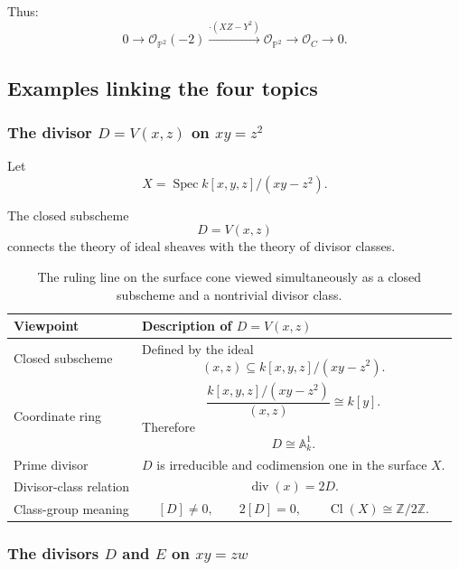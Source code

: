 \documentclass[12pt,a4paper]{article}
\DeclareMathOperator{\Spec}{Spec}
\newcommand{\OO}{\mathcal{O}}
\newcommand{\divisor}{\operatorname{div}}
\newcommand{\Z}{\mathbb{Z}}
\newcommand{\Cl}{\operatorname{Cl}}
\providecommand{\Spec}{\operatorname{Spec}}
\providecommand{\A}{\mathbb A}
\providecommand{\Pj}{\mathbb P}
\theoremstyle{notespace}
\begin{document}
		Thus:
		\[
		\boxed{
			0
			\longrightarrow
			\OO_{\Pj^2}(-2)
			\xrightarrow{\cdot(XZ-Y^2)}
			\OO_{\Pj^2}
			\longrightarrow
			\OO_C
			\longrightarrow
			0.
		}
		\]
		
		\subsection{Examples linking the four topics}
		
		\subsubsection{\texorpdfstring{The divisor \(D=V(x,z)\) on \(xy=z^2\)}{The divisor on the surface cone}}
		
		Let
		\[
		X=\Spec k[x,y,z]/(xy-z^2).
		\]
		
		The closed subscheme
		\[
		D=V(x,z)
		\]
		connects the theory of ideal sheaves with the theory of divisor classes.
		
		\begin{table}[htbp]
			\centering
			\renewcommand{\arraystretch}{1.45}
			\begin{tabular}{|p{4.7cm}|p{9.4cm}|}
				\hline
				\textbf{Viewpoint}
				&
				\textbf{Description of \(D=V(x,z)\)}
				\\
				\hline
				Closed subscheme
				&
				Defined by the ideal
				\[
				(x,z)\subseteq k[x,y,z]/(xy-z^2).
				\]
				\\
				\hline
				Coordinate ring
				&
				\[
				\frac{k[x,y,z]/(xy-z^2)}{(x,z)}
				\cong
				k[y].
				\]
				Therefore
				\[
				D\cong\A^1_k.
				\]
				\\
				\hline
				Prime divisor
				&
				\(D\) is irreducible and codimension one in the surface \(X\).
				\\
				\hline
				Divisor-class relation
				&
				\[
				\divisor(x)=2D.
				\]
				\\
				\hline
				Class-group meaning
				&
				\[
				[D]\neq0,
				\qquad
				2[D]=0,
				\qquad
				\Cl(X)\cong\Z/2\Z.
				\]
				\\
				\hline
			\end{tabular}
			\caption{The ruling line on the surface cone viewed simultaneously as a closed subscheme and a nontrivial divisor class.}
		\end{table}
		
		\subsubsection{\texorpdfstring{The divisors \(D\) and \(E\) on \(xy=zw\)}{The divisors on the three-dimensional cone}}
		
\end{document}
